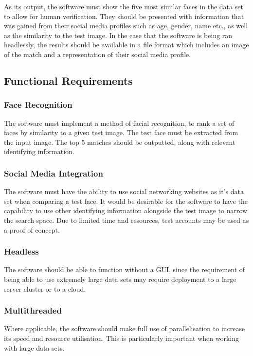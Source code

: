 \documentclass[12pt]{article}
\begin{document}
As its output, the software must show the five most similar faces in the data set to allow for human verification. They should be presented with information that was gained from their social media profiles such as age, gender, name etc., as well as the similarity to the test image. In the case that the software is being ran headlessly, the results should be available in a file format which includes an image of the match and a representation of their social media profile.

\subsection{Functional Requirements}
\subsubsection{Face Recognition}
The software must implement a method of facial recognition, to rank a set of faces by similarity to a given test image. The test face must be extracted from the input image. The top 5 matches should be outputted, along with relevant identifying information.

\subsubsection{Social Media Integration}
The software must have the ability to use social networking websites as it's data set when comparing a test face. It would be desirable for the software to have the capability to use other identifying information alongside the test image to narrow the search space. Due to limited time and resources, test accounts may be used as a proof of concept.

\subsubsection{Headless}
The software should be able to function without a GUI, since the requirement of being able to use extremely large data sets may require deployment to a large server cluster or to a cloud.

\subsubsection{Multithreaded}
Where applicable, the software should make full use of parallelisation to increase its speed and resource utilisation. This is particularly important when working with large data sets.
\end{document}

